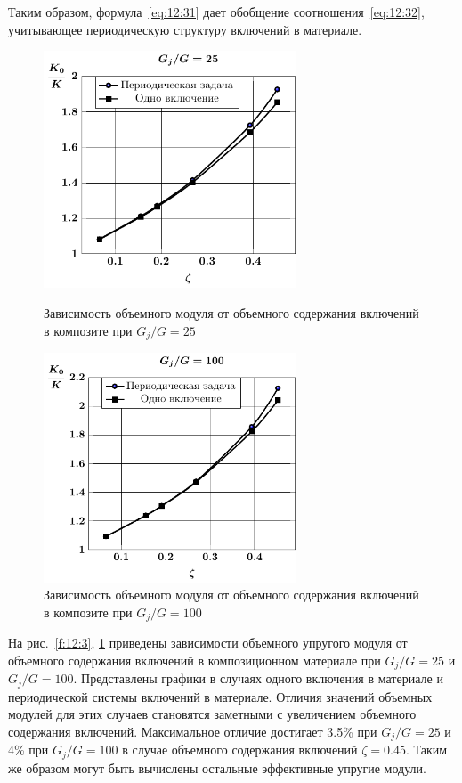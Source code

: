 Таким образом, формула~\eqref{eq:12:31} дает обобщение соотношения~\eqref{eq:12:32}, учитывающее периодическую структуру включений в материале.

\begin{figure}[h!]
\centering\footnotesize
\parbox[b]{7.5cm}{\centering\includegraphics[width=7.5cm]{composite-spheres-g25-k.pdf}
\caption{Зависимость объемного модуля от объемного содержания включений в композите при $G_j/G=25$
\label{f:12:3}}}\hfil\hfil
\parbox[b]{7.5cm}{\centering\includegraphics[width=7.5cm]{composite-spheres-g100-k.pdf}
\caption{Зависимость объемного модуля от объемного содержания включений в композите при $G_j/G=100$
\label{f:12:4}}}
\end{figure}

На рис.~\ref{f:12:3}, \ref{f:12:4} приведены зависимости объемного упругого модуля от объемного содержания включений в композиционном материале при $G_j/G=25$ и $G_j/G=100$. Представлены графики в случаях одного включения в материале и периодической системы включений в материале. Отличия значений объемных модулей для этих случаев становятся заметными с увеличением объемного содержания включений. Максимальное отличие достигает 3.5\% при $G_j/G=25$ и 4\% при $G_j/G=100$ в случае объемного содержания включений $\zeta=0.45$. Таким же образом могут быть вычислены остальные эффективные упругие модули.
